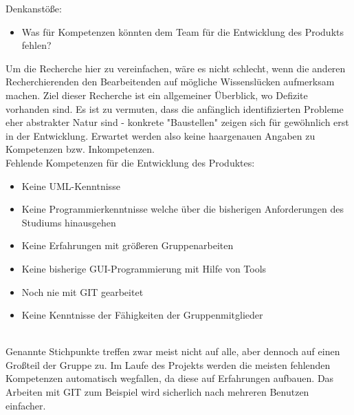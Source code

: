 Denkanstöße:
\begin{itemize}
\item Was für Kompetenzen könnten dem Team für die Entwicklung des Produkts fehlen?
\end{itemize}
Um die Recherche hier zu vereinfachen, wäre es nicht schlecht, wenn die anderen Recherchierenden den Bearbeitenden auf mögliche Wissenslücken aufmerksam machen. Ziel dieser Recherche ist ein allgemeiner Überblick, wo Defizite vorhanden sind. Es ist zu vermuten, dass die anfänglich identifizierten Probleme eher abstrakter Natur sind - konkrete "Baustellen" zeigen sich für gewöhnlich erst in der Entwicklung. Erwartet werden also keine haargenauen Angaben zu Kompetenzen bzw. Inkompetenzen.
\\
Fehlende Kompetenzen für die Entwicklung des Produktes:
\begin{itemize}
\item Keine UML-Kenntnisse
\item Keine Programmierkenntnisse welche über die bisherigen Anforderungen des Studiums hinausgehen
\item Keine Erfahrungen mit größeren Gruppenarbeiten
\item Keine bisherige GUI-Programmierung mit Hilfe von Tools
\item Noch nie mit GIT gearbeitet
\item Keine Kenntnisse der Fähigkeiten der Gruppenmitglieder
\end{itemize}
\\
Genannte Stichpunkte treffen zwar meist nicht auf alle, aber dennoch auf einen Großteil der Gruppe zu.
Im Laufe des Projekts werden die meisten fehlenden Kompetenzen automatisch wegfallen, da diese auf Erfahrungen aufbauen. Das Arbeiten mit GIT zum Beispiel wird sicherlich nach mehreren Benutzen einfacher.
\nsecend
